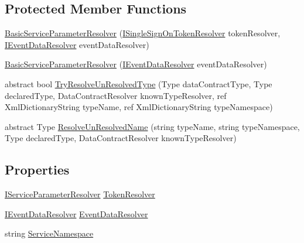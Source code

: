 \subsection*{Protected Member Functions}
\begin{DoxyCompactItemize}
\item 
\hyperlink{classCqrs_1_1Services_1_1BasicServiceParameterResolver_af82f43a2f64aa5c33a3692a2a689367b_af82f43a2f64aa5c33a3692a2a689367b}{Basic\+Service\+Parameter\+Resolver} (\hyperlink{interfaceCqrs_1_1Services_1_1ISingleSignOnTokenResolver}{I\+Single\+Sign\+On\+Token\+Resolver} token\+Resolver, \hyperlink{interfaceCqrs_1_1Services_1_1IEventDataResolver}{I\+Event\+Data\+Resolver} event\+Data\+Resolver)
\item 
\hyperlink{classCqrs_1_1Services_1_1BasicServiceParameterResolver_a74e001363a0226b4fbf5d3796e1230a9_a74e001363a0226b4fbf5d3796e1230a9}{Basic\+Service\+Parameter\+Resolver} (\hyperlink{interfaceCqrs_1_1Services_1_1IEventDataResolver}{I\+Event\+Data\+Resolver} event\+Data\+Resolver)
\item 
abstract bool \hyperlink{classCqrs_1_1Services_1_1BasicServiceParameterResolver_ab1de06b3744da74df0708545666c9f6f_ab1de06b3744da74df0708545666c9f6f}{Try\+Resolve\+Un\+Resolved\+Type} (Type data\+Contract\+Type, Type declared\+Type, Data\+Contract\+Resolver known\+Type\+Resolver, ref Xml\+Dictionary\+String type\+Name, ref Xml\+Dictionary\+String type\+Namespace)
\item 
abstract Type \hyperlink{classCqrs_1_1Services_1_1BasicServiceParameterResolver_a2815cb9d0647e0b019d3f148a0c8e9cc_a2815cb9d0647e0b019d3f148a0c8e9cc}{Resolve\+Un\+Resolved\+Name} (string type\+Name, string type\+Namespace, Type declared\+Type, Data\+Contract\+Resolver known\+Type\+Resolver)
\end{DoxyCompactItemize}
\subsection*{Properties}
\begin{DoxyCompactItemize}
\item 
\hyperlink{interfaceCqrs_1_1Services_1_1IServiceParameterResolver}{I\+Service\+Parameter\+Resolver} \hyperlink{classCqrs_1_1Services_1_1BasicServiceParameterResolver_a0ed208048d0f925dfa1e14fb73d82f0b_a0ed208048d0f925dfa1e14fb73d82f0b}{Token\+Resolver}
\item 
\hyperlink{interfaceCqrs_1_1Services_1_1IEventDataResolver}{I\+Event\+Data\+Resolver} \hyperlink{classCqrs_1_1Services_1_1BasicServiceParameterResolver_a49d548e272010a9047bac9671e5b1f70_a49d548e272010a9047bac9671e5b1f70}{Event\+Data\+Resolver}
\item 
string \hyperlink{classCqrs_1_1Services_1_1BasicServiceParameterResolver_a78d53a2ee367086bca9f2d2118746836_a78d53a2ee367086bca9f2d2118746836}{Service\+Namespace}
\end{DoxyCompactItemize}


